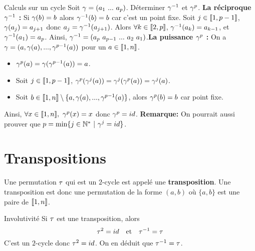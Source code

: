 \documentclass[11pt]{article}
\begin{document}
\begin{ex}{Calculs sur un cycle}{}
    Soit $\gamma=(a_1~...~a_p)$. Déterminer $\gamma^{-1}$ et $\gamma^p$.
    \tcblower
    \textbf{La réciproque $\gamma^{-1}$ :}\n
    Si $\gamma(b)=b$ alors $\gamma^{-1}(b)=b$ car c'est un point fixe.\n
    Soit $j\in\llbracket1,p-1\rrbracket$, $\gamma(a_j)=a_{j+1}$ donc $a_j=\gamma^{-1}(a_{j+1})$.\n
    Alors $\forall k \in \llbracket2,p\rrbracket$, $\gamma^{-1}(a_k)=a_{k-1}$, et $\gamma^{-1}(a_1)=a_p$.\n
    Ainsi, $\gamma^{-1}=(a_p ~ a_{p-1} ~ ... ~ a_2 ~ a_1)$.\n[0.2cm]
    \textbf{La puissance $\gamma^p$ :}\n
    On a $\gamma=(a, \gamma(a), ..., \gamma^{p-1}(a))$ pour un $a\in\llbracket1,n\rrbracket$.\n
    \begin{itemize}
        \item $\gamma^p(a)=\gamma(\gamma^{p-1}(a))=a$.
        \item Soit $j\in\llbracket1,p-1\rrbracket$, $\gamma^p(\gamma^j(a))=\gamma^j(\gamma^p(a))=\gamma^j(a)$.
        \item Soit $b\in\llbracket1,n\rrbracket\setminus\{a,\gamma(a),...,\gamma^{p-1}(a)\}$, alors $\gamma^p(b)=b$ car point fixe.
    \end{itemize}
    Ainsi, $\forall x \in \llbracket1,n\rrbracket, ~ \gamma^p(x)=x$ donc $\gamma^p=id$.\n
    \textbf{Remarque:} On pourrait aussi prouver que $p=\min\{j\in\mathbb{N}^*~|~\gamma^j=id\}$.
\end{ex}

\section{Transpositions}

\begin{defi}{}{}
    Une permutation $\tau$ qui est un $2$-cycle est appelé une \textbf{transposition}.\n
    Une transposition est donc une permutation de la forme $(a,b)$ où $\{a,b\}$ est une paire de $\llbracket1,n\rrbracket$.
\end{defi}

\begin{prop}{Involutivité}{}
    Si $\tau$ est une transposition, alors 
    \begin{equation*}
        \tau^2=id \quad \text{et} \quad \tau^{-1}=\tau
    \end{equation*}
    \tcblower
    C'est un $2$-cycle donc $\tau^2=id$.\n
    On en déduit que $\tau^{-1}=\tau$.
\end{prop}
\end{document}
